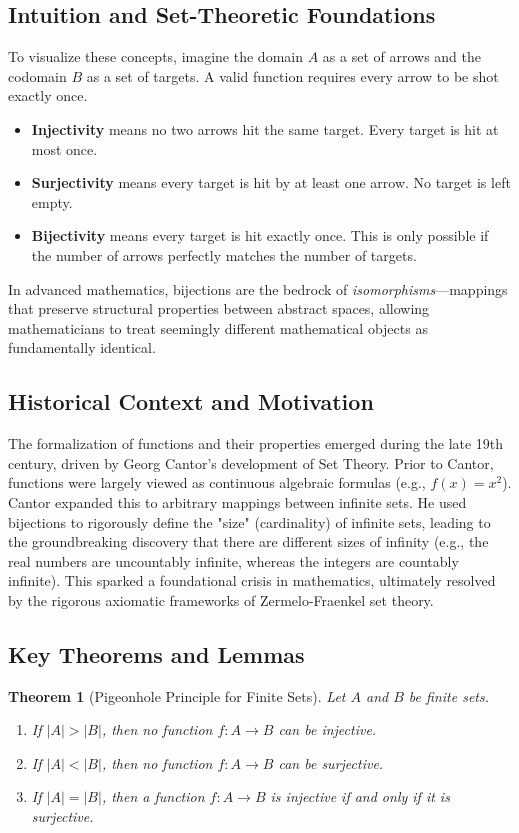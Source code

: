 \documentclass[11pt, a4paper]{article}
\newtheorem{theorem}{Theorem}[section]
\theoremstyle{definition}
\theoremstyle{remark}
\begin{document}
\subsection{Intuition and Set-Theoretic Foundations}
To visualize these concepts, imagine the domain $A$ as a set of arrows and the codomain $B$ as a set of targets. A valid function requires every arrow to be shot exactly once. 
\begin{itemize}
    \item \textbf{Injectivity} means no two arrows hit the same target. Every target is hit at most once.
    \item \textbf{Surjectivity} means every target is hit by at least one arrow. No target is left empty.
    \item \textbf{Bijectivity} means every target is hit exactly once. This is only possible if the number of arrows perfectly matches the number of targets.
\end{itemize}
In advanced mathematics, bijections are the bedrock of \textit{isomorphisms}—mappings that preserve structural properties between abstract spaces, allowing mathematicians to treat seemingly different mathematical objects as fundamentally identical.

\subsection{Historical Context and Motivation}
The formalization of functions and their properties emerged during the late 19th century, driven by Georg Cantor's development of Set Theory. Prior to Cantor, functions were largely viewed as continuous algebraic formulas (e.g., $f(x) = x^2$). Cantor expanded this to arbitrary mappings between infinite sets. He used bijections to rigorously define the "size" (cardinality) of infinite sets, leading to the groundbreaking discovery that there are different sizes of infinity (e.g., the real numbers are uncountably infinite, whereas the integers are countably infinite). This sparked a foundational crisis in mathematics, ultimately resolved by the rigorous axiomatic frameworks of Zermelo-Fraenkel set theory.

\subsection{Key Theorems and Lemmas}
\begin{theorem}[Pigeonhole Principle for Finite Sets]
Let $A$ and $B$ be finite sets. 
\begin{enumerate}
    \item If $|A| > |B|$, then no function $f: A \to B$ can be injective.
    \item If $|A| < |B|$, then no function $f: A \to B$ can be surjective.
    \item If $|A| = |B|$, then a function $f: A \to B$ is injective if and only if it is surjective.
\end{enumerate}
\end{theorem}
\end{document}
